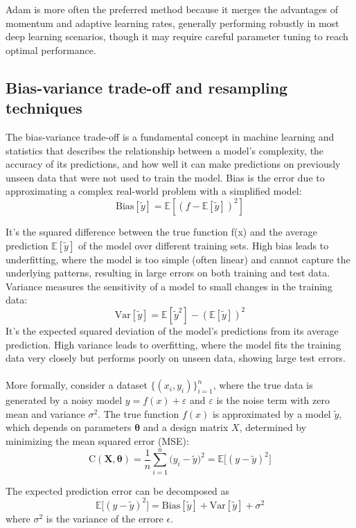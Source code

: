 \documentclass[
 reprint,            %
 amsmath,amssymb,
 aps,
]{revtex4-2}
\begin{document}
Adam is more often the preferred method because it merges the advantages of momentum and adaptive learning rates, generally performing robustly in most deep learning scenarios, though it may require careful parameter tuning to reach optimal performance. \cite{goodfellow2016}




\subsection{Bias-variance trade-off and resampling techniques}

The bias-variance trade-off is a fundamental concept in machine learning and statistics that describes the relationship between a model's complexity, the accuracy of its predictions, and how well it can make predictions on previously unseen data that were not used to train the model\cite{hjorthjensen_week38}. 
Bias is the error due to approximating a complex real-world problem with a simplified model: 
$$\mathrm{Bias}[\tilde y]= \mathbb{E}[(f-\mathbb{E}[\tilde y])^2]$$

It's the squared difference between the true function f(x) and the average prediction $\mathbb{E}[\tilde y]$ of the model over different training sets. High bias leads to underfitting, where the model is too simple (often linear) and cannot capture the underlying patterns, resulting in large errors on both training and test data.
\\Variance measures the sensitivity of a model to small changes in the training data:
$$
\mathrm{Var}[\tilde y] = \mathbb{E}[\tilde y^2] - (\mathbb{E}[\tilde y])^2
$$
It's the expected squared deviation of the model's predictions from its average prediction.
High variance leads to overfitting, where the model fits the training data very closely but performs poorly on unseen data, showing large test errors.\\\\
More formally, consider a dataset $\{(x_i, y_i)\}_{i=1}^n$, where the true data is generated by a noisy model $y = f(x) + \varepsilon$ and $\varepsilon$ is the noise term with zero mean and variance $\sigma^2$. 
The true function $f(x)$ is approximated by a model $\tilde y$, which depends on parameters $\boldsymbol{\theta}$ and a design matrix $X$, determined by minimizing the mean squared error (MSE):
$$
\text{C}(\boldsymbol{X, \theta}) = \frac{1}{n} \sum_{i=1}^n \big( y_i - \tilde y \big)^2= \mathbb{E}\big[(y - \tilde y)^2\big]
$$

The expected prediction error can be decomposed as
$$\mathbb{E}[(y - \tilde y)^2\big] = \mathrm{Bias}[\tilde y] + \mathrm{Var}[\tilde y] + \sigma^2$$
where $\sigma ^2$ is the variance of the errore $\epsilon$. 
\end{document}
